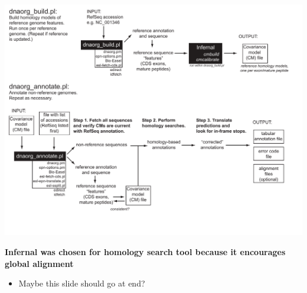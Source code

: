 \documentclass[landscape]{slides}
\begin{document}
\begin{slide}
\includegraphics[width=10in]{figs/dnaorg-scripts-annotate4}
\vfill
\end{slide}
\begin{slide}
\textbf{Infernal was chosen for homology search tool because it
  encourages global alignment}

\begin{itemize}
\item Maybe this slide should go at end? 
\end{itemize}

\vfill
\end{slide}
% 
\end{document}
